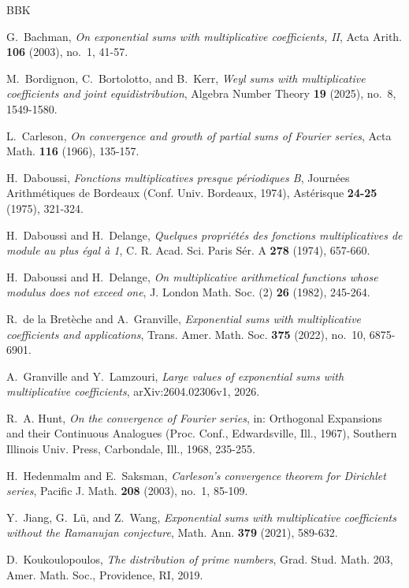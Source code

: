 \documentclass[11pt]{amsart}
\numberwithin{equation}{section}
\numberwithin{figure}{section}
\theoremstyle{definition}
\begin{document}
\begin{thebibliography}{BBK}

G.~Bachman,
\emph{On exponential sums with multiplicative coefficients, II},
Acta Arith. \textbf{106} (2003), no.~1, 41-57.

M.~Bordignon, C.~Bortolotto, and B.~Kerr,
\emph{Weyl sums with multiplicative coefficients and joint equidistribution},
Algebra Number Theory \textbf{19} (2025), no.~8, 1549-1580.

L.~Carleson,
\emph{On convergence and growth of partial sums of Fourier series},
Acta Math. \textbf{116} (1966), 135-157.

H.~Daboussi,
\emph{Fonctions multiplicatives presque p\'eriodiques B},
Journ\'ees Arithm\'etiques de Bordeaux (Conf. Univ. Bordeaux, 1974),
Ast\'erisque \textbf{24-25} (1975), 321-324.

H.~Daboussi and H.~Delange,
\emph{Quelques propri\'et\'es des fonctions multiplicatives de module au plus \'egal \`a 1},
C. R. Acad. Sci. Paris S\'er. A \textbf{278} (1974), 657-660.

H.~Daboussi and H.~Delange,
\emph{On multiplicative arithmetical functions whose modulus does not exceed one},
J. London Math. Soc. (2) \textbf{26} (1982), 245-264.

R.~de la Bret\`eche and A.~Granville,
\emph{Exponential sums with multiplicative coefficients and applications},
Trans. Amer. Math. Soc. \textbf{375} (2022), no.~10, 6875-6901.

A.~Granville and Y.~Lamzouri,
\emph{Large values of exponential sums with multiplicative coefficients},
arXiv:2604.02306v1, 2026.

R.~A. Hunt,
\emph{On the convergence of Fourier series},
in: Orthogonal Expansions and their Continuous Analogues
(Proc. Conf., Edwardsville, Ill., 1967),
Southern Illinois Univ. Press, Carbondale, Ill., 1968, 235-255.

H.~Hedenmalm and E.~Saksman,
\emph{Carleson's convergence theorem for Dirichlet series},
Pacific J. Math. \textbf{208} (2003), no.~1, 85-109.

Y.~Jiang, G.~L\"u, and Z.~Wang,
\emph{Exponential sums with multiplicative coefficients without the
Ramanujan conjecture},
Math. Ann. \textbf{379} (2021), 589-632.

D.~Koukoulopoulos,
\emph{The distribution of prime numbers},
Grad. Stud. Math. 203, Amer. Math. Soc., Providence, RI, 2019.


\end{thebibliography}
\end{document}
